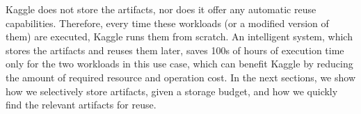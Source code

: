Kaggle does not store the artifacts, nor does it offer any automatic reuse capabilities.
Therefore, every time these workloads (or a modified version of them) are executed, Kaggle runs them from scratch.
An intelligent system, which stores the artifacts and reuses them later, saves 100s of hours of execution time only for the two workloads in this use case, which can benefit Kaggle by reducing the amount of required resource and operation cost.
In the next sections, we show how we selectively store artifacts, given a storage budget, and how we quickly find the relevant artifacts for reuse.